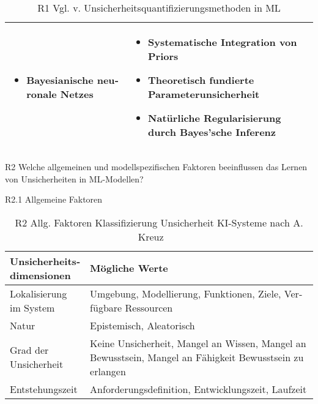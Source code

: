 \begin{otherlanguage}{ngerman}
\begin{table}[!htpb]
\begin{tabular}{|l|p{\dimexpr\textwidth-3cm-2\tabcolsep}|}
\begin{itemize}[topsep=0em, itemsep=0em, left=0em, labelsep=0.25em]
      \item \gls{Bayesianische neuronale Netze}s
    \end{itemize} & 
    \begin{itemize}[topsep=0em, itemsep=0em, left=0em, labelsep=0.25em]
      \item Systematische Integration von Priors
      \item Theoretisch fundierte Parameterunsicherheit
      \item Natürliche Regularisierung durch Bayes'sche Inferenz
    \end{itemize} \\
    \hline
  \end{tabular}
  \caption{R1 Vgl. v. Unsicherheitsquantifizierungsmethoden in ML}\label{tab:chapter6r1}
\end{table}






R2 Welche allgemeinen und modellspezifischen Faktoren beeinflussen das Lernen von Unsicherheiten in ML-Modellen?

\newline
R2.1 Allgemeine Faktoren

\begin{table}[!htpb]
  \begin{tabular}{|l|p{10cm}|}
    \hline
    \textbf{Unsicherheitsdimensionen} & \textbf{Mögliche Werte} \\
    \hline
    Lokalisierung im System & Umgebung, Modellierung, Funktionen, Ziele, Verfügbare Ressourcen \\
    \hline
    Natur & Epistemisch, Aleatorisch \\
    \hline
    Grad der Unsicherheit & Keine Unsicherheit, Mangel an Wissen, Mangel an Bewusstsein, Mangel an Fähigkeit Bewusstsein zu erlangen \\
    \hline
    Entstehungszeit & Anforderungsdefinition, Entwicklungszeit, Laufzeit \\
    \hline
  \end{tabular}
  \caption{R2 Allg. Faktoren Klassifizierung Unsicherheit KI-Systeme nach A. Kreuz ~\nocite{AndreasKreutz2022} ~\nocite{AndreasKreutz2022b}}\label{tab:chapter6r21}
\end{table}


\end{otherlanguage}
